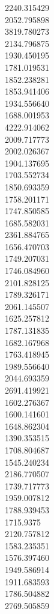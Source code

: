 2240.315429\\
2052.795898\\
3819.780273\\
2134.796875\\
1930.450195\\
1781.019531\\
1852.238281\\
1853.941406\\
1934.556640\\
1688.001953\\
4222.914062\\
2009.717773\\
2002.026367\\
1904.137695\\
1703.552734\\
1850.693359\\
1758.201171\\
1747.850585\\
1685.582031\\
2361.884765\\
1656.470703\\
1749.207031\\
1746.084960\\
2101.828125\\
1789.326171\\
2061.145507\\
1625.257812\\
1787.131835\\
1682.167968\\
1763.418945\\
1989.556640\\
2044.693359\\
2691.419921\\
1602.276367\\
1600.141601\\
1648.862304\\
1390.353515\\
1708.804687\\
1545.240234\\
2186.770507\\
1739.717773\\
1959.007812\\
1788.939453\\
1715.9375\\
2120.757812\\
1583.235351\\
1576.397460\\
1949.586914\\
1911.683593\\
1786.504882\\
2769.505859\\
